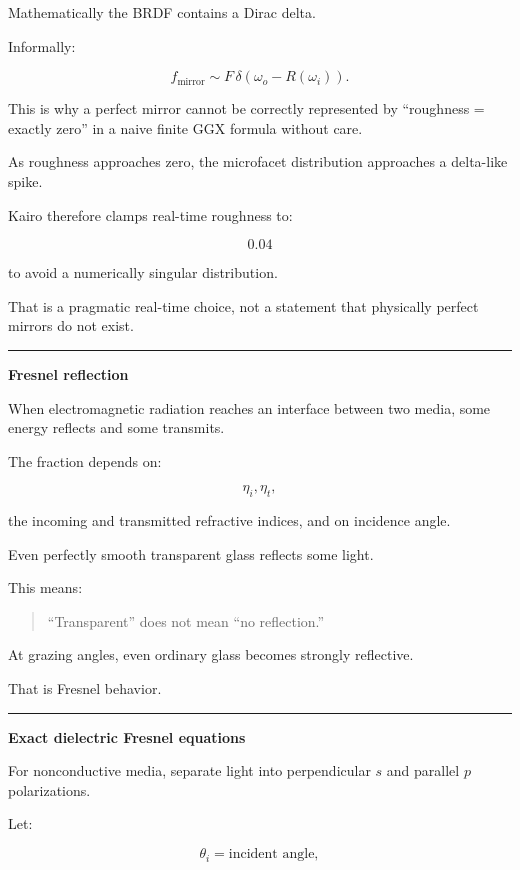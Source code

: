 Mathematically the BRDF contains a Dirac delta.

Informally:

\[
f_{\text{mirror}}
\sim
F\,\delta(\omega_o-R(\omega_i)).
\]

This is why a perfect mirror cannot be correctly represented by ``roughness = exactly zero'' in a naive finite GGX formula without care.

As roughness approaches zero, the microfacet distribution approaches a delta-like spike.

Kairo therefore clamps real-time roughness to:

\[
0.04
\]

to avoid a numerically singular distribution.

That is a pragmatic real-time choice, not a statement that physically perfect mirrors do not exist.

\begin{center}\rule{0.5\linewidth}{0.5pt}\end{center}

\textbf{Fresnel reflection}

When electromagnetic radiation reaches an interface between two media, some energy reflects and some transmits.

The fraction depends on:

\[
\eta_i,\eta_t,
\]

the incoming and transmitted refractive indices, and on incidence angle.

Even perfectly smooth transparent glass reflects some light.

This means:

\begin{quote}
``Transparent'' does not mean ``no reflection.''
\end{quote}

At grazing angles, even ordinary glass becomes strongly reflective.

That is Fresnel behavior.

\begin{center}\rule{0.5\linewidth}{0.5pt}\end{center}

\textbf{Exact dielectric Fresnel equations}

For nonconductive media, separate light into perpendicular \(s\) and parallel \(p\) polarizations.

Let:

\[
\theta_i=\text{incident angle},
\]

